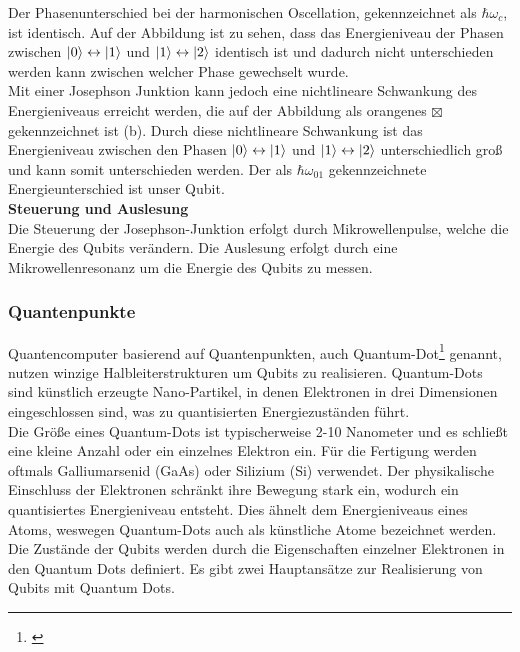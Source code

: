 Der Phasenunterschied bei der harmonischen Oscellation, gekennzeichnet als $\hbar\omega_c$, ist identisch. Auf der Abbildung ist zu sehen, dass das Energieniveau der Phasen zwischen $\ket{0} \leftrightarrow \ket{1}$
und $\ket{1} \leftrightarrow \ket{2}$ identisch ist und dadurch nicht unterschieden werden kann zwischen welcher Phase gewechselt wurde.\\

Mit einer Josephson Junktion kann jedoch eine nichtlineare Schwankung des Energieniveaus erreicht werden, die auf der Abbildung als orangenes $\boxtimes$ gekennzeichnet ist (b).
Durch diese nichtlineare Schwankung ist das Energieniveau zwischen den Phasen $\ket{0} \leftrightarrow \ket{1}$ und $\ket{1} \leftrightarrow \ket{2}$ unterschiedlich groß und kann somit unterschieden werden.
Der als $\hbar\omega_{01}$ gekennzeichnete Energieunterschied ist unser Qubit.\\

\textbf{Steuerung und Auslesung}\\
Die Steuerung der Josephson-Junktion erfolgt durch Mikrowellenpulse, welche die Energie des Qubits verändern. Die Auslesung erfolgt durch eine Mikrowellenresonanz um die Energie des Qubits zu messen.\\

\subsubsection{Quantenpunkte}
\label{subsub:quantenpunkte}
Quantencomputer basierend auf Quantenpunkten, auch Quantum-Dot\footnote{\cite{loss_quantum_1998}} genannt, nutzen winzige Halbleiterstrukturen um Qubits zu realisieren.
Quantum-Dots sind künstlich erzeugte Nano-Partikel, in denen Elektronen in drei Dimensionen eingeschlossen sind, was zu quantisierten Energiezuständen führt.\\

Die Größe eines Quantum-Dots ist typischerweise 2-10 Nanometer und es schließt eine kleine Anzahl oder ein einzelnes Elektron ein.
Für die Fertigung werden oftmals Galliumarsenid (GaAs) oder Silizium (Si) verwendet. Der physikalische Einschluss der Elektronen schränkt ihre
Bewegung stark ein, wodurch ein quantisiertes Energieniveau entsteht. Dies ähnelt dem Energieniveaus eines Atoms, weswegen Quantum-Dots auch als künstliche Atome bezeichnet werden.\\

Die Zustände der Qubits werden durch die Eigenschaften einzelner Elektronen in den Quantum Dots definiert. Es gibt zwei Hauptansätze zur Realisierung von Qubits mit Quantum Dots.\\

